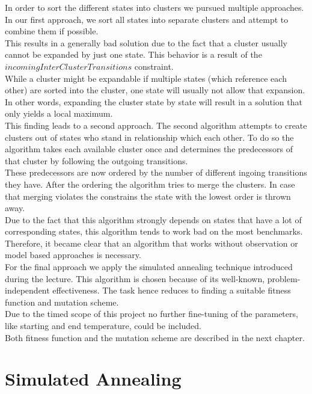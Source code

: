 In order to sort the different states into clusters we pursued multiple approaches.
In our first approach, we sort all states into separate clusters and attempt to combine them if possible. \\
This results in a generally bad solution due to the fact that a cluster usually cannot be expanded by just one state. This behavior is a result of the $ incomingInterClusterTransitions $ constraint. \\
While a cluster might be expandable if multiple states (which reference each other) are sorted into the cluster, one state will usually not allow that expansion. \\
In other words, expanding the cluster state by state will result in a solution that only yields a local maximum.\\
This finding leads to a second approach. The second algorithm attempts to create clusters out of states who stand in relationship which each other. To do so the algorithm takes each available cluster once and determines the predecessors of that cluster by following the outgoing transitions. \\
These predecessors are now ordered by the number of different ingoing transitions they have. After the ordering the algorithm tries to merge the clusters. In case that merging violates the constrains the state with the lowest order is thrown away. \\
Due to the fact that this algorithm strongly depends on states that have a lot of corresponding states, this algorithm tends to work bad on the most benchmarks. Therefore, it became clear that an algorithm that works without observation or model based approaches is necessary. \\


For the final approach we apply the simulated annealing technique introduced during the lecture. This algorithm is chosen because of its well-known, problem-independent effectiveness. The task hence reduces to finding a suitable fitness function and mutation scheme.\\
Due to the timed scope of this project no further fine-tuning of the parameters, like starting and end temperature, could be included. \\
Both fitness function and the mutation scheme are described in the next chapter.\\



\chapter{Simulated Annealing}
\label{cha:SimulateAnnealing}

